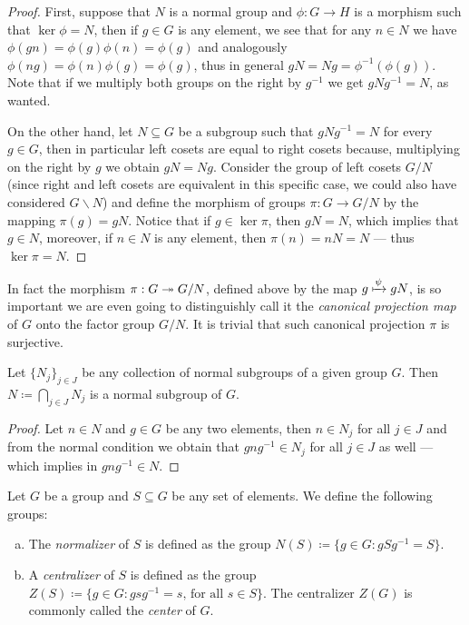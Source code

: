 \begin{proof}
First, suppose that \(N\) is a normal group and \(\phi: G \to H\) is a morphism
such that \(\ker \phi = N\), then if \(g \in G\) is any element, we see that for
any \(n \in N\) we have \(\phi(g n) = \phi(g) \phi(n) = \phi(g)\) and
analogously \(\phi(n g) = \phi(n) \phi(g) = \phi(g)\), thus in general \(g N = N
g = \phi^{-1}(\phi(g))\). Note that if we multiply both groups on the right by
\(g^{-1}\) we get \(g N g^{-1} = N\), as wanted.

On the other hand, let \(N \subseteq G\) be a subgroup such that \(g N g^{-1} =
N\) for every \(g \in G\), then in particular left cosets are equal to right
cosets because, multiplying on the right by \(g\) we obtain \(g N = N
g\). Consider the group of left cosets \(G/N\) (since right and left cosets are
equivalent in this specific case, we could also have considered \(G \backslash
N\)) and define the morphism of groups \(\pi: G \to G/N\) by the mapping
\(\pi(g) = g N\). Notice that if \(g \in \ker \pi\), then \(g N = N\), which
implies that \(g \in N\), moreover, if \(n \in N\) is any element, then
\(\pi(n) = n N = N\) --- thus \(\ker \pi = N\).
\end{proof}

In fact the morphism \(\pi: G \twoheadrightarrow G/N\), defined above by the map \(g \xmapsto
\psi g N\), is so important we are even going to distinguishly call it the
\emph{canonical projection map} of \(G\) onto the factor group \(G/N\). It is
trivial that such canonical projection \(\pi\) is surjective.

\begin{corollary}
\label{cor:intersection-normal-subgroups}
Let \(\{N_{j}\}_{j \in J}\) be any collection of normal subgroups of a given
group \(G\). Then \(N \coloneq \bigcap_{j \in J} N_j\) is a normal subgroup of
\(G\).
\end{corollary}

\begin{proof}
Let \(n \in N\) and \(g \in G\) be any two elements, then \(n \in N_j\) for all
\(j \in J\) and from the normal condition we obtain that \(g n g^{-1} \in N_j\)
for all \(j \in J\) as well --- which implies in \(g n g^{-1} \in N\).
\end{proof}

\begin{definition}
\label{def:normalizer-centralizer}
Let \(G\) be a group and \(S \subseteq G\) be any set of elements. We define the
following groups:
\begin{enumerate}[(a)]\setlength\itemsep{0em}
\item The \emph{normalizer} of \(S\) is defined as the group \(N(S) \coloneq \{g
  \in G \colon g S g^{-1} = S\}\).
\item A \emph{centralizer} of \(S\) is defined as the group \(Z(S) \coloneq \{g
  \in G \colon g s g^{-1} = s \text{, for all } s \in S\}\). The centralizer
  \(Z(G)\) is commonly called the \emph{center} of \(G\).
\end{enumerate}
\end{definition}

